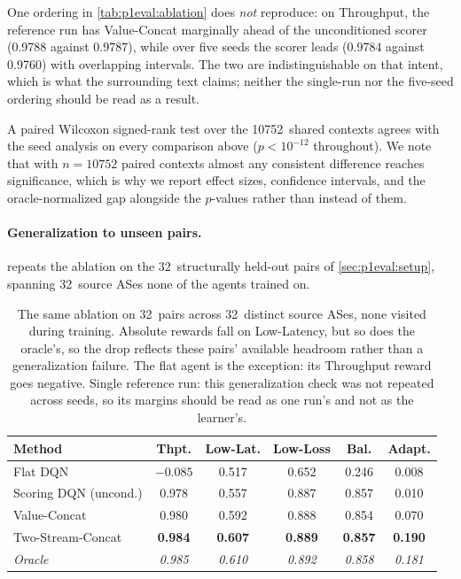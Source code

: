 One ordering in \cref{tab:p1eval:ablation} does \emph{not} reproduce: on Throughput, the reference run has Value-Concat marginally ahead of the unconditioned
scorer (0.9788 against 0.9787), while over five seeds the scorer leads (0.9784 against 0.9760) with
overlapping intervals. The two are indistinguishable on that intent, which is what the surrounding text
claims; neither the single-run nor the five-seed ordering should be read as a result.

A paired Wilcoxon signed-rank test over the 10752~shared contexts agrees with the seed analysis on every
comparison above ($p < 10^{-12}$ throughout). We note that with $n = 10752$ paired contexts almost any
consistent difference reaches significance, which is why we report effect sizes, confidence intervals,
and the oracle-normalized gap alongside the $p$-values rather than instead of them.

\paragraph{Generalization to unseen pairs.}  repeats the ablation on the
32~structurally held-out pairs of \cref{sec:p1eval:setup}, spanning 32~source ASes none of the agents
trained on.

\begin{table}[t]
  \centering
  \caption[The ablation on structurally held-out pairs]{The same ablation on 32~pairs across 32~distinct source ASes, none visited during training.
  Absolute rewards fall on Low-Latency, but so does the oracle's, so the drop reflects these pairs'
  available headroom rather than a generalization failure. The flat agent is the exception: its
  Throughput reward goes negative. Single reference run: this generalization check was not repeated
  across seeds, so its margins should be read as one run's and not as the learner's.}
  \label{tab:p1eval:heldout}
  \small
  \begin{tabular}{lccccc}
    \toprule
    Method & Thpt. & Low-Lat. & Low-Loss & Bal. & Adapt. \\
    \midrule
    Flat DQN              & $-0.085$ & 0.517 & 0.652 & 0.246 & 0.008 \\
    Scoring DQN (uncond.) & 0.978 & 0.557 & 0.887 & 0.857 & 0.010 \\
    Value-Concat          & 0.980 & 0.592 & 0.888 & 0.854 & 0.070 \\
    Two-Stream-Concat     & \textbf{0.984} & \textbf{0.607} & \textbf{0.889} & \textbf{0.857}
                          & \textbf{0.190} \\
    \midrule
    \emph{Oracle}         & \emph{0.985} & \emph{0.610} & \emph{0.892} & \emph{0.858} & \emph{0.181} \\
    \bottomrule
  \end{tabular}
\end{table}

